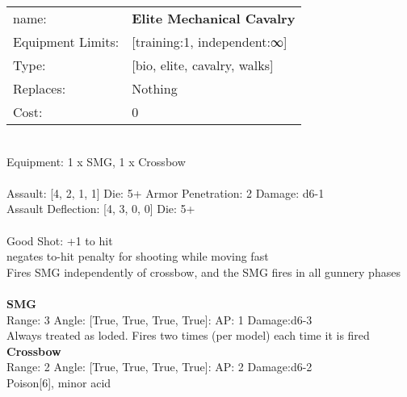\noindent 

\noindent
\begin{tabular}{ll}
name: &{\bf Elite Mechanical Cavalry } \\
Equipment Limits: &[training:1, independent:∞] \\
Type: &[bio, elite, cavalry, walks] \\
Replaces: &Nothing \\
Cost: & 0\\
\end{tabular}
\ \\
Equipment: 1 x SMG, 1 x Crossbow \\
\ \\
Assault: [4, 2, 1, 1] Die: 5+ Armor Penetration: 2 Damage: d6-1 \\
Assault Deflection: [4, 3, 0, 0] Die: 5+\\
\indent  
\ \\
Good Shot: +1 to hit\\ 
negates to-hit penalty for shooting while moving fast\\ 
Fires SMG independently of crossbow, and the SMG fires in all gunnery phases\\ 

\ \\
{\bf SMG } \\



Range: 3  Angle: [True, True, True, True]: AP: 1 Damage:d6-3 \\
Always treated as loded. Fires two times (per model) each time it is fired\\ 




{\bf Crossbow } \\



Range: 2  Angle: [True, True, True, True]: AP: 2 Damage:d6-2 \\
Poison[6], minor acid\\ 




 
\ \\



